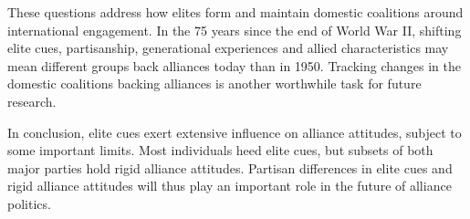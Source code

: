 \documentclass[12pt]{article}
\begin{document}
These questions address how elites form and maintain domestic coalitions around international engagement. 
In the 75 years since the end of World War II, shifting elite cues, partisanship, generational experiences and allied characteristics may mean different groups back alliances today than in 1950. 
Tracking changes in the domestic coalitions backing alliances is another worthwhile task for future research.


In conclusion, elite cues exert extensive influence on alliance attitudes, subject to some important limits.
Most individuals heed elite cues, but subsets of both major parties hold rigid alliance attitudes. 
Partisan differences in elite cues and rigid alliance attitudes will thus play an important role in the future of alliance politics.



\newpage

 
 
\end{document}
